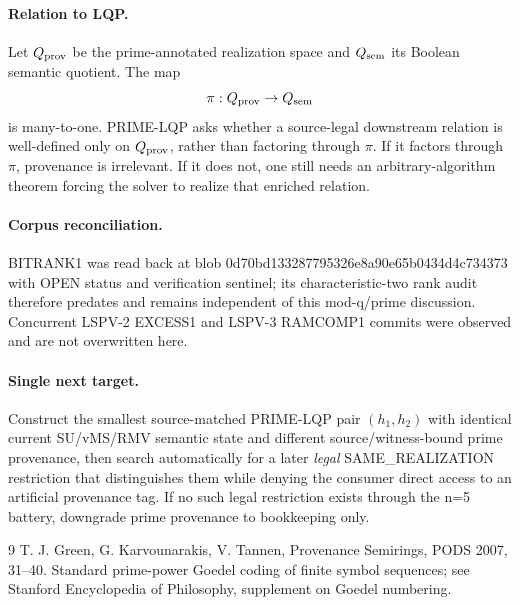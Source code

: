 \documentclass[11pt]{article}
\begin{document}
\paragraph{Relation to LQP.}
Let $Q_{\rm prov}$ be the prime-annotated realization space and $Q_{\rm sem}$ its Boolean semantic quotient. The map
\[
\pi:Q_{\rm prov}\to Q_{\rm sem}
\]
is many-to-one. PRIME-LQP asks whether a source-legal downstream relation is well-defined only on $Q_{\rm prov}$, rather than factoring through $\pi$. If it factors through $\pi$, provenance is irrelevant. If it does not, one still needs an arbitrary-algorithm theorem forcing the solver to realize that enriched relation.

\paragraph{Corpus reconciliation.}
BITRANK1 was read back at blob 0d70bd133287795326e8a90e65b0434d4c734373 with OPEN status and verification sentinel; its characteristic-two rank audit therefore predates and remains independent of this mod-q/prime discussion. Concurrent LSPV-2 EXCESS1 and LSPV-3 RAMCOMP1 commits were observed and are not overwritten here.

\paragraph{Single next target.}
Construct the smallest source-matched PRIME-LQP pair $(h_1,h_2)$ with identical current SU/vMS/RMV semantic state and different source/witness-bound prime provenance, then search automatically for a later \emph{legal} SAME\_REALIZATION restriction that distinguishes them while denying the consumer direct access to an artificial provenance tag. If no such legal restriction exists through the n=5 battery, downgrade prime provenance to bookkeeping only.

\begin{thebibliography}{9}
 T. J. Green, G. Karvounarakis, V. Tannen, Provenance Semirings, PODS 2007, 31--40.
 Standard prime-power Goedel coding of finite symbol sequences; see Stanford Encyclopedia of Philosophy, supplement on Goedel numbering.
\end{thebibliography}
\end{document}
